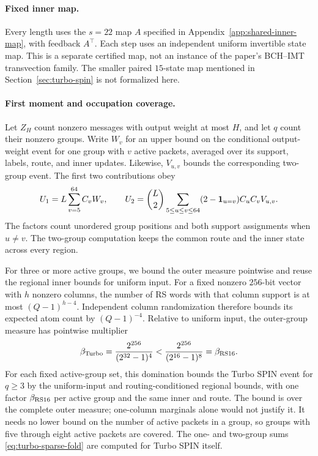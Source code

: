 \paragraph{Fixed inner map.}
Every length uses the $s=22$ map $A$ specified in
Appendix~\ref{app:shared-inner-map}, with feedback $A^\top$. Each step
uses an independent uniform invertible state map. This is a separate
certified map, not an instance of the paper's BCH--IMT transvection
family. The smaller paired $15$-state map mentioned in
Section~\ref{sec:turbo-spin} is not formalized here.

\paragraph{First moment and occupation coverage.}
Let $Z_H$ count nonzero messages with output weight at most $H$, and let
$q$ count their nonzero groups. Write $W_v$ for an upper bound on the
conditional output-weight event for one group with $v$ active packets,
averaged over its support, labels, route, and inner updates. Likewise,
$V_{u,v}$ bounds the corresponding two-group event. The first two
contributions obey
\begin{equation}
 U_1=L\sum_{v=5}^{64}C_vW_v,\qquad
 U_2=\binom L2\sum_{5\le u\le v\le64}
       (2-\mathbf 1_{u=v})C_uC_vV_{u,v}.
 \label{eq:turbo-sparse-fold}
\end{equation}
The factors count unordered group positions and both support assignments
when $u\ne v$. The two-group computation keeps the common route and the
inner state across every region.

For three or more active groups, we bound the outer measure pointwise
and reuse the regional inner bounds for uniform input.
For a fixed nonzero $256$-bit vector with $h$ nonzero columns, the
number of RS words with that column support is at most $(Q-1)^{h-4}$.
Independent column randomization therefore bounds its expected atom count
by $(Q-1)^{-4}$. Relative to uniform input, the outer-group measure has
pointwise multiplier
\[
 \beta_{\rm Turbo}=\frac{2^{256}}{(2^{32}-1)^4}
 <\frac{2^{256}}{(2^{16}-1)^8}
 =\beta_{\rm RS16}.
\]
For each fixed active-group set, this domination bounds the Turbo SPIN
event for $q\ge3$ by the uniform-input and routing-conditioned regional
bounds, with one factor $\beta_{\rm RS16}$ per active group and the same
inner and route. The bound is over the complete outer measure; one-column
marginals alone would not justify it. It needs no lower bound on the
number of active packets in a group, so groups with five through eight
active packets are covered. The one- and two-group sums
\eqref{eq:turbo-sparse-fold} are computed for Turbo SPIN itself.

